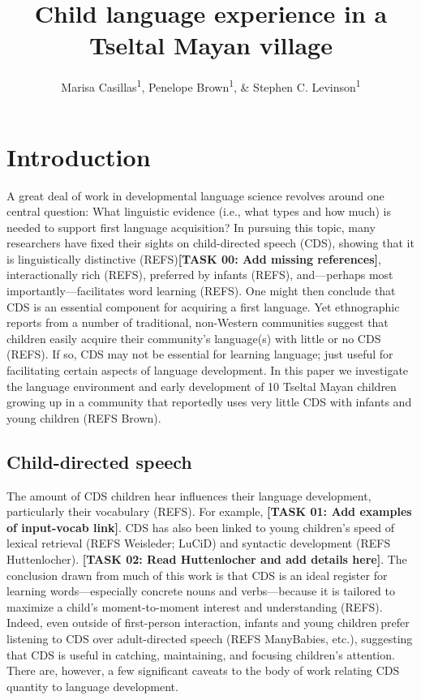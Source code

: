 \documentclass[man]{apa6}
\title{Child language experience in a Tseltal Mayan village}
\author{Marisa Casillas\textsuperscript{1}, Penelope Brown\textsuperscript{1}, \& Stephen C. Levinson\textsuperscript{1}}
\affiliation{
    \vspace{0.5cm}
          \textsuperscript{1} Max Planck Institute for Psycholinguistics  }
\theoremstyle{definition}
\theoremstyle{definition}
\theoremstyle{definition}
\theoremstyle{remark}
\begin{document}
\maketitle

\setcounter{secnumdepth}{0}



\section{Introduction}\label{introduction}

A great deal of work in developmental language science revolves around
one central question: What linguistic evidence (i.e., what types and how
much) is needed to support first language acquisition? In pursuing this
topic, many researchers have fixed their sights on child-directed speech
(CDS), showing that it is linguistically distinctive
(REFS)\textbf{{[}TASK 00: Add missing references{]}}, interactionally
rich (REFS), preferred by infants (REFS), and---perhaps most
importantly---facilitates word learning (REFS). One might then conclude
that CDS is an essential component for acquiring a first language. Yet
ethnographic reports from a number of traditional, non-Western
communities suggest that children easily acquire their community's
language(s) with little or no CDS (REFS). If so, CDS may not be
essential for learning language; just useful for facilitating certain
aspects of language development. In this paper we investigate the
language environment and early development of 10 Tseltal Mayan children
growing up in a community that reportedly uses very little CDS with
infants and young children (REFS Brown).

\subsection{Child-directed speech}\label{child-directed-speech}

The amount of CDS children hear influences their language development,
particularly their vocabulary (REFS). For example, \textbf{{[}TASK 01:
Add examples of input-vocab link{]}}. CDS has also been linked to young
children's speed of lexical retrieval (REFS Weisleder; LuCiD) and
syntactic development (REFS Huttenlocher). \textbf{{[}TASK 02: Read
Huttenlocher and add details here{]}}. The conclusion drawn from much of
this work is that CDS is an ideal register for learning
words---especially concrete nouns and verbs---because it is tailored to
maximize a child's moment-to-moment interest and understanding (REFS).
Indeed, even outside of first-person interaction, infants and young
children prefer listening to CDS over adult-directed speech (REFS
ManyBabies, etc.), suggesting that CDS is useful in catching,
maintaining, and focusing children's attention. There are, however, a
few significant caveats to the body of work relating CDS quantity to
language development.
\end{document}
